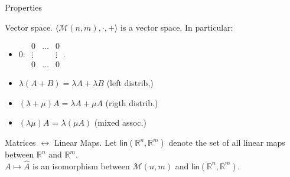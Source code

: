 \documentclass{beamer}
\begin{document}
\begin{frame}{Properties}

  \begin{block}{Vector space.}
    $\langle \mathcal{M}(n, m), \cdot, {+}\rangle$ is a vector space. In particular:
    \begin{itemize}
    \item $0$: $\begin{array}{|ccc|} 0 & \dots & 0\\ \vdots & & \vdots\\ 0 & \dots & 0 \end{array}$.
    \item $\lambda (A + B) = \lambda A + \lambda B$ (left distrib,)
    \item $(\lambda + \mu) A = \lambda A + \mu A$ (rigth distrib.)
    \item $(\lambda \mu) A$ = $\lambda (\mu A)$ (mixed assoc.)
    \end{itemize}
  \end{block}

  \begin{block}{Matrices $\leftrightarrow$ Linear Maps.}
    Let $\textsf{lin}(\mathbb{R}^n, \mathbb{R}^m)$ denote the set of all linear maps between $\mathbb{R}^n$ and $\mathbb{R}^m$.\\
    $A \mapsto \hat{A}$ is an isomorphism between $\mathcal{M}(n,m)$ and $\textsf{lin}(\mathbb{R}^n, \mathbb{R}^m)$.
  \end{block}

\end{frame}
\end{document}
